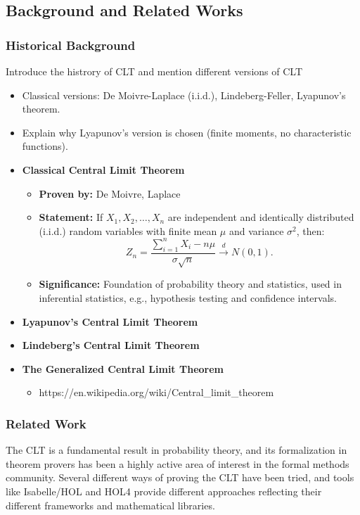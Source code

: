 \subsection{Background and Related Works}
\subsubsection{Historical Background}
Introduce the histrory of CLT and mention different versions of CLT \cite{fischer2011history}
\begin{itemize}
    \item Classical versions: De Moivre-Laplace (i.i.d.), Lindeberg-Feller, Lyapunov’s theorem.
    \item Explain why Lyapunov’s version is chosen (finite moments, no characteristic functions).
\end{itemize}

\begin{itemize}
    \item \textbf{Classical Central Limit Theorem} \cite{ross2019first}
    \begin{itemize}
        \item \textbf{Proven by:} De Moivre, Laplace
        \item \textbf{Statement:} If \( X_1, X_2, \ldots, X_n \) are independent and identically distributed (i.i.d.) random variables with finite mean \( \mu \) and variance \( \sigma^2 \), then:
  \[
  Z_n = \frac{\sum_{i=1}^n X_i - n\mu}{\sigma\sqrt{n} } \xrightarrow{d} N(0, 1).
  \]
  \item \textbf{Significance:} Foundation of probability theory and statistics, used in inferential statistics, e.g., hypothesis testing and confidence intervals.
    \end{itemize}

    \item \textbf{Lyapunov’s Central Limit Theorem} \cite{chung2000course}
    \item \textbf{Lindeberg’s Central Limit Theorem}
    \item \textbf{The Generalized Central Limit Theorem} 
    \begin{itemize}
        \item https://en.wikipedia.org/wiki/Central_limit_theorem
    \end{itemize}

\end{itemize}

\subsubsection{Related Work}
The CLT is a fundamental result in probability theory, and its formalization in theorem provers has been a highly active area of interest in the formal methods community. Several different ways of proving the CLT have been tried, and tools like Isabelle/HOL and HOL4 provide different approaches reflecting their different frameworks and mathematical libraries.

